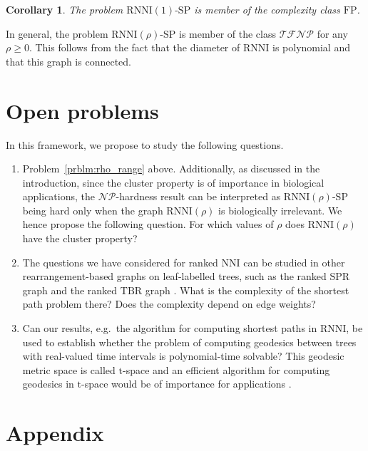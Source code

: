 \documentclass[11pt]{amsart}
\newtheorem{corollary}{Corollary}
\newcommand{\rnni}{\mathrm{RNNI}}
\newcommand{\nni}{\mathrm{NNI}}
\newcommand{\spr}{\mathrm{SPR}}
\newcommand{\tbr}{\mathrm{TBR}}
\newcommand{\fp}{\mathrm{FP}}
\newcommand{\tfnp}{\mathcal{TFNP}}
\newcommand{\np}{\mathcal{NP}}
\newcommand{\decprob}[1]{\rnni(#1)\text{-}\mathrm{SP}}
\begin{document}
\begin{corollary}
	The problem $\decprob{1}$ is member of the complexity class $\fp$.
\end{corollary}

In general, the problem $\decprob{\rho}$ is member of the class $\tfnp$ \autocite{Megiddo1991-lr} for any $\rho \geq 0$.
This follows from the fact that the diameter of $\rnni$ is polynomial and that this graph is connected.


\section{Open problems}

In this framework, we propose to study the following questions.
\begin{enumerate}
\item Problem~\ref{prblm:rho_range} above.
Additionally, as discussed in the introduction, since the cluster property is of importance in biological applications, the $\np$-hardness result can be interpreted as $\decprob{\rho}$ being hard only when the graph $\rnni(\rho)$ is biologically irrelevant.
We hence propose the following question.
For which values of $\rho$ does $\rnni(\rho)$ have the cluster property?


\item The questions we have considered for ranked $\nni$ can be studied in other rearrangement-based graphs on leaf-labelled trees, such as the ranked $\spr$ graph and the ranked $\tbr$ graph \autocite{Semple2003-nj}.
What is the complexity of the shortest path problem there?
Does the complexity depend on edge weights?

\item Can our results, e.g.\ the algorithm for computing shortest paths in $\rnni$, be used to establish whether the problem of computing geodesics between trees with real-valued time intervals is polynomial-time solvable?
This geodesic metric space is called $\mathrm t$-space and an efficient algorithm for computing geodesics in $\mathrm t$-space would be of importance for applications \autocite{Gavryushkin2016-uu}.
\end{enumerate}


\section*{Appendix}
\renewcommand{\figurename}{Supplementary Figure}
\end{document}
